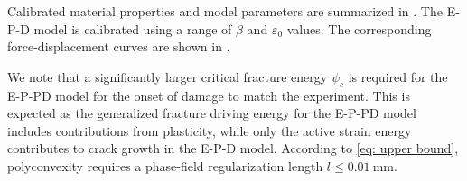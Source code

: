 

Calibrated material properties and model parameters are summarized in . The E-P-D model is calibrated using a range of $\beta$ and $\varepsilon_0$ values. The corresponding force-displacement curves are shown in .

We note that a significantly larger critical fracture energy $\psi_c$ is required for the E-P-PD model for the onset of damage to match the experiment. This is expected as the generalized fracture driving energy for the E-P-PD model includes contributions from plasticity, while only the active strain energy contributes to crack growth in the E-P-D model. According to \eqref{eq: upper bound}, polyconvexity requires a phase-field regularization length $l \leq \SI{0.01}{\milli\meter}$.

